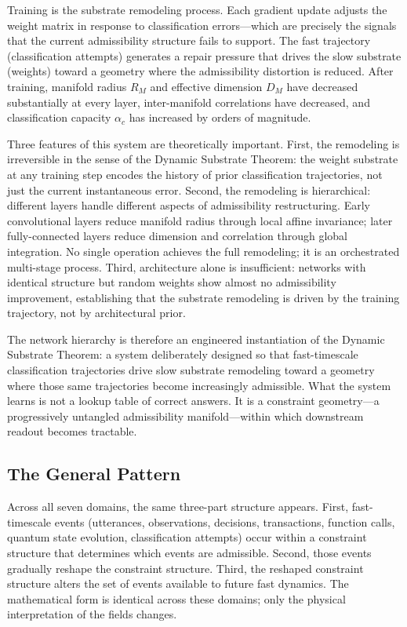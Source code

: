 \documentclass[12pt,a4paper]{article}
\begin{document}
Training is the substrate remodeling process. Each gradient update adjusts the weight matrix in response to classification errors---which are precisely the signals that the current admissibility structure fails to support. The fast trajectory (classification attempts) generates a repair pressure that drives the slow substrate (weights) toward a geometry where the admissibility distortion is reduced. After training, manifold radius $R_M$ and effective dimension $D_M$ have decreased substantially at every layer, inter-manifold correlations have decreased, and classification capacity $\alpha_c$ has increased by orders of magnitude.

Three features of this system are theoretically important. First, the remodeling is irreversible in the sense of the Dynamic Substrate Theorem: the weight substrate at any training step encodes the history of prior classification trajectories, not just the current instantaneous error. Second, the remodeling is hierarchical: different layers handle different aspects of admissibility restructuring. Early convolutional layers reduce manifold radius through local affine invariance; later fully-connected layers reduce dimension and correlation through global integration. No single operation achieves the full remodeling; it is an orchestrated multi-stage process. Third, architecture alone is insufficient: networks with identical structure but random weights show almost no admissibility improvement, establishing that the substrate remodeling is driven by the training trajectory, not by architectural prior.

The network hierarchy is therefore an engineered instantiation of the Dynamic Substrate Theorem: a system deliberately designed so that fast-timescale classification trajectories drive slow substrate remodeling toward a geometry where those same trajectories become increasingly admissible. What the system learns is not a lookup table of correct answers. It is a constraint geometry---a progressively untangled admissibility manifold---within which downstream readout becomes tractable.

\subsection{The General Pattern}

Across all seven domains, the same three-part structure appears. First, fast-timescale events (utterances, observations, decisions, transactions, function calls, quantum state evolution, classification attempts) occur within a constraint structure that determines which events are admissible. Second, those events gradually reshape the constraint structure. Third, the reshaped constraint structure alters the set of events available to future fast dynamics. The mathematical form is identical across these domains; only the physical interpretation of the fields changes.
\end{document}
